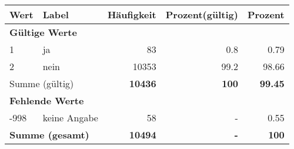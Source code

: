      \begin{longtable}{lXrrr}
     \toprule
     \textbf{Wert} & \textbf{Label} & \textbf{Häufigkeit} & \textbf{Prozent(gültig)} & \textbf{Prozent} \\
     \endhead
     \midrule
     \multicolumn{5}{l}{\textbf{Gültige Werte}}\\

     1 &
     \multicolumn{1}{X}{ ja   } &


       \num{83} &
       \num[round-mode=places,round-precision=2]{0,8} &
         \num[round-mode=places,round-precision=2]{0,79} \\

     2 &
     \multicolumn{1}{X}{ nein   } &


       \num{10353} &
       \num[round-mode=places,round-precision=2]{99,2} &
         \num[round-mode=places,round-precision=2]{98,66} \\
     \midrule
     \multicolumn{2}{l}{Summe (gültig)} &
       \textbf{\num{10436}} &
     \textbf{100} &
       \textbf{\num[round-mode=places,round-precision=2]{99,45}} \\
     \multicolumn{5}{l}{\textbf{Fehlende Werte}}\\
       -998 &
       keine Angabe &
         \num{58} &
        - &
         \num[round-mode=places,round-precision=2]{0,55} \\
     \midrule
     \multicolumn{2}{l}{\textbf{Summe (gesamt)}} &
          \textbf{\num{10494}} &
        \textbf{-} &
        \textbf{100} \\
     \bottomrule
     \end{longtable}
     
